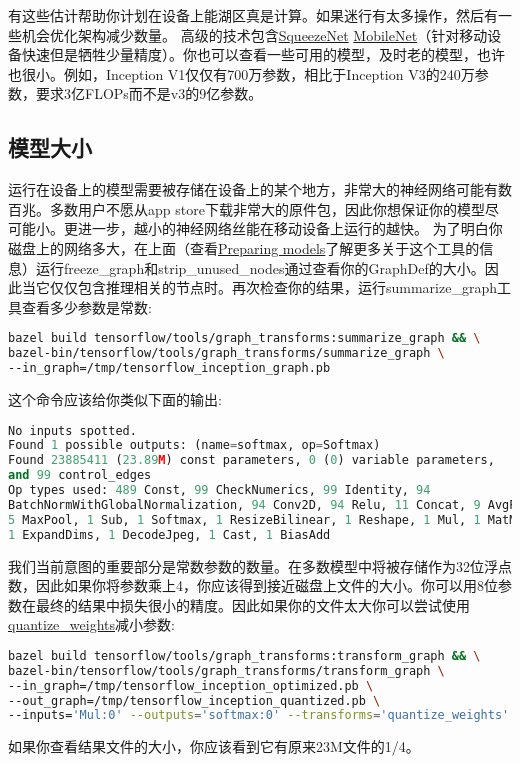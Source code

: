 有这些估计帮助你计划在设备上能湖区真是计算。如果迷行有太多操作，然后有一些机会优化架构减少数量。
高级的技术包含\href{https://arxiv.org/abs/1602.07360}{SqueezeNet} \href{https://arxiv.org/abs/1704.04861}{MobileNet}（针对移动设备快速但是牺牲少量精度）。你也可以查看一些可用的模型，及时老的模型，也许也很小。例如，Inception V1仅仅有700万参数，相比于Inception V3的240万参数，要求3亿FLOPs而不是v3的9亿参数。
\subsection{模型大小}
运行在设备上的模型需要被存储在设备上的某个地方，非常大的神经网络可能有数百兆。多数用户不愿从app store下载非常大的原件包，因此你想保证你的模型尽可能小。更进一步，越小的神经网络丝能在移动设备上运行的越快。
为了明白你磁盘上的网络多大，在上面（查看\href{https://www.tensorflow.org/mobile/prepare_models?hl=zh-cn}{Preparing models}了解更多关于这个工具的信息）运行freeze\_graph和strip\_unused\_nodes通过查看你的GraphDef的大小。因此当它仅仅包含推理相关的节点时。再次检查你的结果，运行summarize\_graph工具查看多少参数是常数:
\begin{lstlisting}[language=Bash]
bazel build tensorflow/tools/graph_transforms:summarize_graph && \
bazel-bin/tensorflow/tools/graph_transforms/summarize_graph \
--in_graph=/tmp/tensorflow_inception_graph.pb
\end{lstlisting}
这个命令应该给你类似下面的输出:
\begin{lstlisting}[language=Python]
No inputs spotted.
Found 1 possible outputs: (name=softmax, op=Softmax)
Found 23885411 (23.89M) const parameters, 0 (0) variable parameters,
and 99 control_edges
Op types used: 489 Const, 99 CheckNumerics, 99 Identity, 94
BatchNormWithGlobalNormalization, 94 Conv2D, 94 Relu, 11 Concat, 9 AvgPool,
5 MaxPool, 1 Sub, 1 Softmax, 1 ResizeBilinear, 1 Reshape, 1 Mul, 1 MatMul,
1 ExpandDims, 1 DecodeJpeg, 1 Cast, 1 BiasAdd 
\end{lstlisting}
我们当前意图的重要部分是常数参数的数量。在多数模型中将被存储作为32位浮点数，因此如果你将参数乘上4，你应该得到接近磁盘上文件的大小。你可以用8位参数在最终的结果中损失很小的精度。因此如果你的文件太大你可以尝试使用\href{https://www.tensorflow.org/performance/quantization?hl=zh-cn}{quantize\_weights}减小参数:
\begin{lstlisting}[language=Bash]
bazel build tensorflow/tools/graph_transforms:transform_graph && \
bazel-bin/tensorflow/tools/graph_transforms/transform_graph \
--in_graph=/tmp/tensorflow_inception_optimized.pb \
--out_graph=/tmp/tensorflow_inception_quantized.pb \
--inputs='Mul:0' --outputs='softmax:0' --transforms='quantize_weights'
\end{lstlisting}
如果你查看结果文件的大小，你应该看到它有原来23M文件的1/4。


